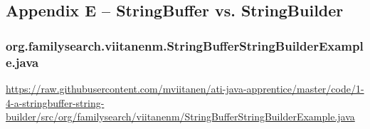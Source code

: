 \subsection*{Appendix E -- StringBuffer vs. StringBuilder} \label{App:AppendixE}

\subsubsection*{org.familysearch.viitanenm.StringBufferStringBuilderExample.java}
\noindent
\begin{minipage}{.6in}
\end{minipage}
\begin{minipage}{6in}
  \url{https://raw.githubusercontent.com/mviitanen/ati-java-apprentice/master/code/1-4-a-stringbuffer-string-builder/src/org/familysearch/viitanenm/StringBufferStringBuilderExample.java}
\end{minipage}